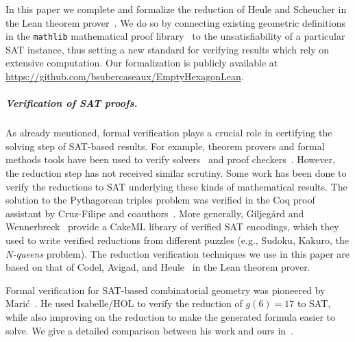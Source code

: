 
In this paper we complete and formalize the reduction of Heule and Scheucher in the Lean theorem prover~\cite{demouraLeanTheoremProver2015}. We do so by connecting existing geometric definitions
in the \texttt{mathlib} mathematical proof library~\cite{The_mathlib_Community_2020}
to the unsatisfiability of a particular SAT instance, thus setting a new standard for verifying results which rely on extensive computation.
Our formalization is publicly available at \url{https://github.com/bsubercaseaux/EmptyHexagonLean}.


\subparagraph*{Verification of SAT proofs.}
As already mentioned, formal verification plays a crucial role in certifying the solving step of SAT-based results.
For example, theorem provers and formal methods tools have been used to verify solvers~\cite{10maric_formal_verification_modern_sat_solver_shallow_embedding_isabelle_hol,oeVersatVerifiedModern2012,skotam_creusat_2022}
and proof checkers~\cite{lammichEfficientVerifiedSAT2020,tanVerifiedPropagationRedundancy2023}.
However, the reduction step has not received similar scrutiny.
Some work has been done to verify the reductions to SAT underlying these kinds of mathematical results.
The solution to the Pythagorean triples problem
was verified in the \textsf{Coq} proof assistant
by Cruz-Filipe and coauthors~\cite{formalPythagoreanTriples,LPAR-21:Formally_Proving_Boolean_Pythagorean}.
More generally,
Giljeg\r{a}rd and Wennerbreck~\cite{GilAndWennerbeck} provide a \textsf{CakeML} library
of verified SAT encodings,
which they used to write verified reductions from different puzzles
(e.g., Sudoku, Kakuro, the \emph{N-queens} problem).
The reduction verification techniques we use in this paper
are based on that of Codel, Avigad, and Heule~\cite{Cayden} in the Lean theorem prover.

Formal verification for SAT-based combinatorial geometry
was pioneered by Marić~\cite{19maric_fast_formal_proof_erdos_szekeres_conjecture_convex_polygons_most_six_points}.
He used \textsf{Isabelle/HOL} to verify the reduction of $g(6) = 17$ to SAT,
while also improving on the reduction to make the generated formula easier to solve.
We give a detailed comparison between his work and ours in~.

